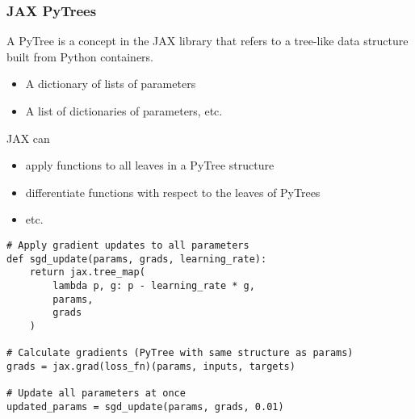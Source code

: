 \begin{frame}
    \frametitle{JAX PyTrees}

    A PyTree is a concept in the JAX library that refers to a tree-like data structure built from Python containers.

    \Egs

    \begin{itemize}
        \item A dictionary of lists of parameters
        \item A list of dictionaries of parameters, etc.
    \end{itemize}

    JAX can

    \begin{itemize}
        \item apply functions to all leaves in a PyTree structure
        \item differentiate functions with respect to the leaves of PyTrees
        \item etc.
    \end{itemize}

\end{frame}


\begin{frame}
    
    
    \resizebox{1.0\textwidth}{!}{
        
    }

\end{frame}


\begin{frame}[fragile]
    
    \begin{verbatim}
# Apply gradient updates to all parameters
def sgd_update(params, grads, learning_rate):
    return jax.tree_map(
        lambda p, g: p - learning_rate * g, 
        params, 
        grads
    )

# Calculate gradients (PyTree with same structure as params)
grads = jax.grad(loss_fn)(params, inputs, targets)

# Update all parameters at once
updated_params = sgd_update(params, grads, 0.01)    
    \end{verbatim}

\end{frame}

